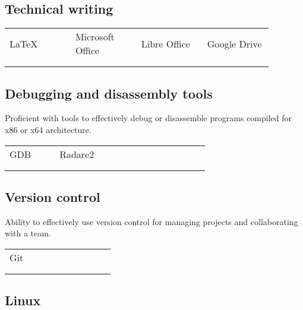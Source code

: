 \documentclass[letterpaper]{article}
\begin{document}
        \subsection*{Technical writing}

        \begin{tabular}{p{0.22\linewidth} p{0.22\linewidth} p{0.22\linewidth} p{0.22\linewidth}}
            \\
            LaTeX & Microsoft Office & Libre Office & Google Drive \\
            \\
            \\
        \end{tabular}

        \subsection*{Debugging and disassembly tools}
        Proficient with tools to effectively debug or disassemble programs compiled for x86 or x64 architecture.

        \begin{tabular}{p{0.22\linewidth} p{0.22\linewidth} p{0.22\linewidth} p{0.22\linewidth}}
            \\
            GDB & Radare2 \\
            \\
            \\
        \end{tabular}

        \subsection*{Version control}
        Ability to effectively use version control for managing projects and collaborating with a team.

        \begin{tabular}{p{0.22\linewidth} p{0.22\linewidth} p{0.22\linewidth} p{0.22\linewidth}}
            \\
            Git \\
            \\
            \\
        \end{tabular}

        \subsection*{Linux}
\end{document}

